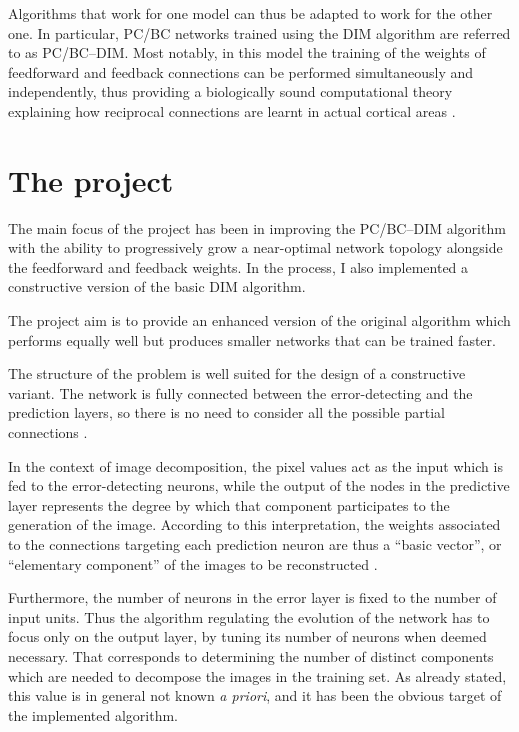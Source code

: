 \documentclass[11pt,a4paper]{report}
\newcommand{\quot}[1]{``#1''}
\begin{document}
			Algorithms that work for one model can thus be adapted to work for the other one. In particular, PC/BC networks trained using the DIM algorithm are referred to as PC/BC--DIM. Most notably, in this model the training of the weights of feedforward and feedback connections can be performed simultaneously and independently, thus providing a biologically sound computational theory explaining how reciprocal connections are learnt in actual cortical areas \cite{callaway1998local,spratling2012unsupervised}.
		
		\section{The project}
			The main focus of the project has been in improving the PC/BC--DIM algorithm with the ability to progressively grow a near-optimal network topology alongside the feedforward and feedback weights. In the process, I also implemented a constructive version of the basic DIM algorithm.
		
			The project aim is to provide an enhanced version of the original algorithm which performs equally well but produces smaller networks that can be trained faster.
		
			The structure of the problem is well suited for the design of a constructive variant. The network is fully connected between the error-detecting and the prediction layers, so there is no need to consider all the possible partial connections \cite{?}.
		
			In the context of image decomposition, the pixel values act as the input which is fed to the error-detecting neurons, while the output of the nodes in the predictive layer represents the degree by which that component participates to the generation of the image. According to this interpretation, the weights associated to the connections targeting each prediction neuron are thus a \quot{basic vector}, or \quot{elementary component} of the images to be reconstructed \cite{spratling2014predictive}.

			Furthermore, the number of neurons in the error layer is fixed to the number of input units. Thus the algorithm regulating the evolution of the network has to focus only on the output layer, by tuning its number of neurons when deemed necessary. That corresponds to determining the number of distinct components which are needed to decompose the images in the training set. As already stated, this value is in general not known \emph{a priori}, and it has been the obvious target of the implemented algorithm.
		
\end{document}
